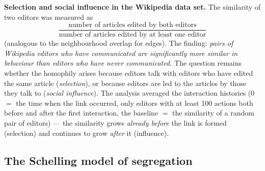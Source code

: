\documentclass[11pt,a4paper]{article}
\theoremstyle{definition}
\begin{document}
\textbf{Selection and social influence in the Wikipedia data set.} The similarity of two editors was
measured as
\[ \frac{\text{number of articles edited by both editors}}
   {\text{number of articles edited by at least one editor}} \]
(analogous to the neighbourhood overlap for edges). The finding: \emph{pairs of Wikipedia editors who
have communicated are significantly more similar in behaviour than editors who have never
communicated.} The question remains whether the homophily arises because editors talk with editors
who have edited the same article (\emph{selection}), or because editors are led to the articles by
those they talk to (\emph{social influence}). The analysis averaged the interaction histories (0 $=$
the time when the link occurred, only editors with at least 100 actions both before and after the
first interaction, the baseline $=$ the similarity of a random pair of editors) --- the similarity
grows \emph{already before} the link is formed (selection) and continues to grow \emph{after} it
(influence).

\subsection{The Schelling model of segregation}
\end{document}
